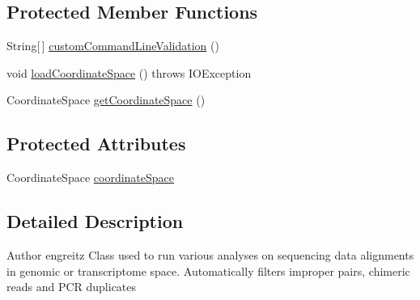 \subsection*{Protected Member Functions}
\begin{DoxyCompactItemize}
\item 
String\mbox{[}$\,$\mbox{]} \hyperlink{classbroad_1_1pda_1_1seq_1_1rap_1_1_genome_command_line_program_a10e8c8b90dd0a384d3140710e7341051}{custom\+Command\+Line\+Validation} ()
\item 
void \hyperlink{classbroad_1_1pda_1_1seq_1_1rap_1_1_genome_command_line_program_ac0bfd8f95856e325eb0a82c8ef3a77b8}{load\+Coordinate\+Space} ()  throws I\+O\+Exception 
\item 
Coordinate\+Space \hyperlink{classbroad_1_1pda_1_1seq_1_1rap_1_1_genome_command_line_program_a59439a63626d967a2b7f781b83479a8e}{get\+Coordinate\+Space} ()
\end{DoxyCompactItemize}
\subsection*{Protected Attributes}
\begin{DoxyCompactItemize}
\item 
Coordinate\+Space \hyperlink{classbroad_1_1pda_1_1seq_1_1rap_1_1_genome_command_line_program_afc325af5b3b4a5698675575c3bc01ab7}{coordinate\+Space}
\end{DoxyCompactItemize}


\subsection{Detailed Description}
\begin{DoxyAuthor}{Author}
engreitz Class used to run various analyses on sequencing data alignments in genomic or transcriptome space. Automatically filters improper pairs, chimeric reads and P\+C\+R duplicates 
\end{DoxyAuthor}


